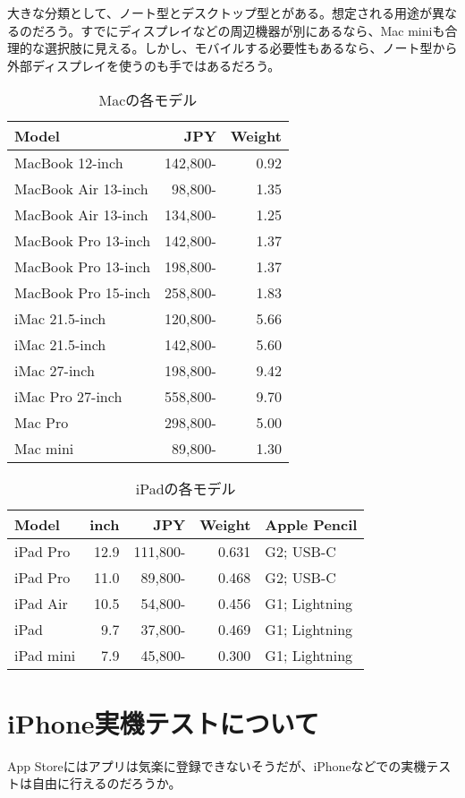 \documentclass[uplatex,dvipdfmx]{jsarticle} \usepackage{amsmath,amssymb,bm}
\begin{document}
大きな分類として、ノート型とデスクトップ型とがある。想定される用途が異なるのだろう。すでにディスプレイなどの周辺機器が別にあるなら、Mac miniも合理的な選択肢に見える。しかし、モバイルする必要性もあるなら、ノート型から外部ディスプレイを使うのも手ではあるだろう。

\begin{table}\centering
\begin{tabular}{lrr}
Model&JPY&Weight \\\hline
MacBook 12-inch&142,800-&0.92 \\
MacBook Air 13-inch&98,800-&1.35 \\
MacBook Air 13-inch&134,800-&1.25 \\
MacBook Pro 13-inch&142,800-&1.37 \\
MacBook Pro 13-inch&198,800-&1.37 \\
MacBook Pro 15-inch&258,800-&1.83 \\\hline
iMac 21.5-inch&120,800-&5.66 \\
iMac 21.5-inch&142,800-&5.60 \\
iMac 27-inch&198,800-&9.42 \\
iMac Pro 27-inch&558,800-&9.70 \\
Mac Pro&298,800-&5.00 \\
Mac mini&89,800-&1.30 \\\hline
\end{tabular}
\caption{Macの各モデル}
\end{table}

\begin{table}\centering
\begin{tabular}{lrrrl}
Model&inch&JPY&Weight&Apple Pencil \\\hline
iPad Pro &12.9&111,800-&0.631&G2; USB-C \\
iPad Pro &11.0&89,800-&0.468&G2; USB-C \\
iPad Air&10.5&54,800-&0.456&G1; Lightning \\
iPad&9.7&37,800-&0.469&G1; Lightning \\
iPad mini&7.9&45,800-&0.300&G1; Lightning \\\hline
\end{tabular}
\caption{iPadの各モデル}
\end{table}


\section*{iPhone実機テストについて}
App Storeにはアプリは気楽に登録できないそうだが、iPhoneなどでの実機テストは自由に行えるのだろうか。
\end{document}
